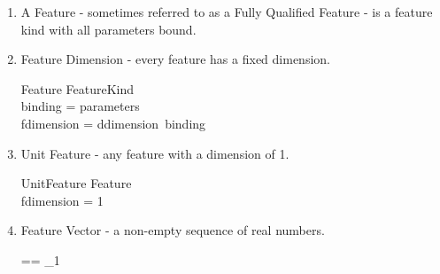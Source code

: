 \documentclass[11pt]{article}
\begin{document}
\begin{enumerate}
\begin{zed}
	Binding == \power (Var \cross Const) 
\end{zed}

Every feature kind has a dimension (not necessarily fixed). 

\begin{schema}{FeatureKind}
	name :  FeatureName \\
	parameters : \power Var \\
	dparameters : \power Var \\
	binding : Binding \\
	ddimension : Binding \pfun \nat  \\ 
	fdimension : Dimension  \\
\where
	dparameters  \subseteq parameters  \\
	\forall b : Binding |  b \in (\dom ddimension) @ dparameters \subseteq  (\dom b) 
\end{schema}

\item A \textsf{Feature} -  sometimes referred to as a Fully Qualified Feature - is  a feature kind with all parameters bound. 

\item \textsf{Feature Dimension} - every feature has a fixed  dimension. 

\begin{schema}{Feature}
	FeatureKind \\
\where
	\dom binding = parameters \\
	fdimension = ddimension~binding
\end{schema}

\item \textsf{Unit Feature} - any feature with a dimension of 1.
	
\begin{schema}{UnitFeature}
	Feature \\
\where
	fdimension = 1
\end{schema}

\item \textsf{Feature Vector} - a non-empty sequence of real numbers.

\begin{zed}
	\FV == \seq_1 \R 
\end{zed}




\end{enumerate}
\end{document}
